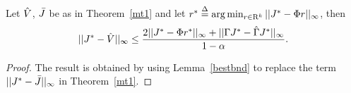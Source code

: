 \begin{corollary}\label{cmt1}
Let $\hat{V}$, $\bar{J}$ be as in Theorem~\ref{mt1} and let $r^*\stackrel{\Delta}{=}\arg\min_{r\in \mathrm{R}^k}||J^*-\Phi r||_\infty$, then
\begin{align}
||J^*-\hat{V}||_\infty\leq \frac{2||J^*-\Phi r^*||_\infty+||\Gamma J^*-\hat{\Gamma} J^*||_\infty}{1-\alpha}.
\end{align}
\end{corollary}
\begin{proof}
The result is obtained by using Lemma~\ref{bestbnd} to replace the term $||J^*-\bar{J}||_\infty$ in Theorem~\ref{mt1}.
\end{proof}
